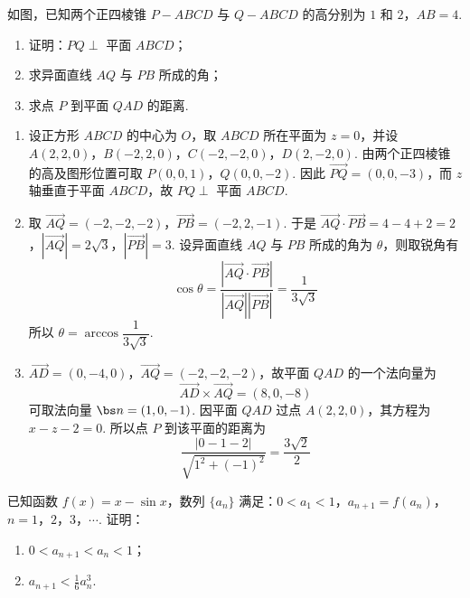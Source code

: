 \begin{problem}
如图，已知两个正四棱锥 \(P - ABCD\) 与 \(Q - ABCD\) 的高分别为 \(1\) 和 \(2\)，\(AB = 4\).

\begin{enumerate}
\item 证明：\(PQ \perp\) 平面 \(ABCD\)；
\item 求异面直线 \(AQ\) 与 \(PB\) 所成的角；
\item 求点 \(P\) 到平面 \(QAD\) 的距离.
\end{enumerate}

\end{problem}

\begin{solution}
\begin{enumerate}
\item 设正方形 \(ABCD\) 的中心为 \(O\)，取 \(ABCD\) 所在平面为 \(z=0\)，并设 \(A(2,2,0)\)，\(B(-2,2,0)\)，\(C(-2,-2,0)\)，\(D(2,-2,0)\). 由两个正四棱锥的高及图形位置可取 \(P(0,0,1)\)，\(Q(0,0,-2)\). 因此 \(\overrightarrow{PQ}=(0,0,-3)\)，而 \(z\) 轴垂直于平面 \(ABCD\)，故 \(PQ\perp\) 平面 \(ABCD\).
\item 取 \(\overrightarrow{AQ}=(-2,-2,-2)\)，\(\overrightarrow{PB}=(-2,2,-1)\). 于是
\(\overrightarrow{AQ}\cdot\overrightarrow{PB}=4-4+2=2\)，\(\left|\overrightarrow{AQ}\right|=2\sqrt{3}\)，\(\left|\overrightarrow{PB}\right|=3\).
设异面直线 \(AQ\) 与 \(PB\) 所成的角为 \(\theta\)，则取锐角有
\[
\cos\theta=\frac{\left|\overrightarrow{AQ}\cdot\overrightarrow{PB}\right|}{\left|\overrightarrow{AQ}\right|\left|\overrightarrow{PB}\right|}=\frac{1}{3\sqrt{3}}
\]
所以 \(\theta=\arccos\dfrac{1}{3\sqrt{3}}\).
\item \(\overrightarrow{AD}=(0,-4,0)\)，\(\overrightarrow{AQ}=(-2,-2,-2)\)，故平面 \(QAD\) 的一个法向量为
\[
\overrightarrow{AD}\times\overrightarrow{AQ}=(8,0,-8)
\]
可取法向量 \(\bs n=(1,0,-1)\). 因平面 \(QAD\) 过点 \(A(2,2,0)\)，其方程为 \(x-z-2=0\). 所以点 \(P\) 到该平面的距离为
\[
\frac{\left|0-1-2\right|}{\sqrt{1^{2}+(-1)^{2}}}=\frac{3\sqrt{2}}{2}
\]
\end{enumerate}
\end{solution}

\begin{problem}
已知函数 \( f(x) = x - \sin x \)，数列 \(\{a_n\}\) 满足：\(0 < a_1 < 1\)，\(a_{n+1} = f(a_n)\)，\(n = 1\)，\(2\)，\(3\)，\(\cdots\). 证明：

\begin{enumerate}
\item \(0 < a_{n+1} < a_n < 1\)；
\item \(a_{n+1} < \frac{1}{6} a_n^3\).
\end{enumerate}
\end{problem}


